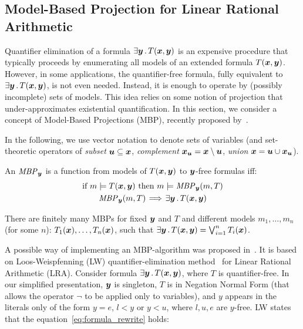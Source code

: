 \subsection{Model-Based Projection for Linear Rational Arithmetic}
\label{sec:mbp}

Quantifier elimination of a formula $\exists \vy \such T(\vx,\vy)$ is an expensive procedure that typically proceeds by enumerating all models of an extended formula $T(\vx,\vy)$.
However, in some applications, the quantifier-free formula, fully equivalent to $\exists \vy \such T(\vx,\vy)$, is not even needed.
Instead, it is enough to operate by (possibly incomplete) sets of models.
This idea relies on some notion of projection that under-approximates existential quantification.
In this section, we consider a concept of Model-Based Projections (MBP), recently proposed by~\cite{komuravelli2014smt,Dutertre}.

In the following, we use vector notation to denote sets of variables (and set-theoretic operators of \emph{subset} $\vu \subseteq \vx$, \emph{complement} $\vx_{\vu} = \vx \setminus \vu$, \emph{union} $\vx = \vu \cup \vx_{\vu}$).
\begin{definition}
\label{def:mbp}
An $\mathit{MBP}_{\vy}$ is a function from models of
$T(\vx,\vy)$ to $\vy$-free formulas
iff:
\begin{gather}
\text{if }m\models T(\vx,\vy) \text{ then } m\models \mathit{MBP}_{\vy}(m,T) \label{mbp.cond1}\\
\mathit{MBP}_{\vy}(m,T) \!\implies\! \exists \vy \such T(\vx,\vy) \label{mbp.cond2}
\end{gather}
\end{definition}

There are finitely many MBPs for fixed  $\vy$ and $T$ and different models $m_1,\ldots,m_n$ (for some $n$):
$T_{1}(\vx),  \ldots, T_{n}(\vx)$, such that
$\exists \vy \such T(\vx,\vy) = \Lor_{i=1}^{n} T_{i}(\vx)$. 

A possible way of implementing an MBP-algorithm was proposed in~\cite{komuravelli2014smt}.
It is based on Loos-Weispfenning (LW)  quantifier-elimination method~\cite{loos1993applying} for Linear Rational Arithmetic (LRA).
Consider formula $\exists \vy \such T(\vx,\vy)$, where $T$ is quantifier-free.
In our simplified presentation,
$\vy$ is singleton, $T$ is in Negation Normal Form (that allows the operator $\neg$ to be applied only to variables), and $y$ appears in the literals only of the form ${y=e}$, ${l<y}$ or ${y<u}$, where $l,u,e$ are $y$-free.
LW states that the equation~\eqref{eq:formula_rewrite} holds:

